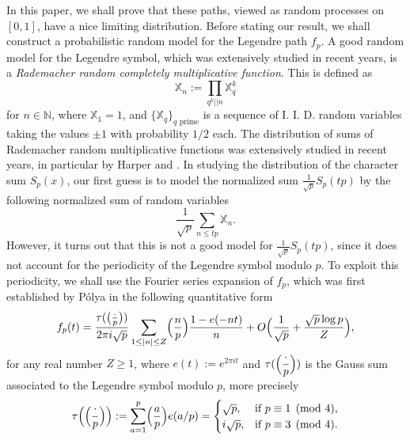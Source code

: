 \documentclass[10pt]{amsart}
\theoremstyle{plain}
\theoremstyle{definition}
\newcommand{\Legendre}[2]{\Bigl(\dfrac{#1}{#2}\Bigr)}
\newcommand{\legendre}[2]{\bigl(\tfrac{#1}{#2}\bigr)}
\newcommand{\X}{\mathbb{X}}
\begin{document}
In this paper, we shall prove that these paths, viewed as random processes on $[0, 1]$, have a nice limiting distribution. Before stating our result, we shall construct a probabilistic random model for the Legendre path $f_p$.
A good random model for the Legendre symbol, which was extensively studied in recent years, is a \emph{Rademacher random completely multiplicative function}. This is defined as\vspace*{-3pt}
\begin{equation}\label{eq: RademacherRandom}\X_n:= \prod_{q^k|| n} \X_q^k
\end{equation}
for $n\in \mathbb{N}$, where $\X_1=1$, and $\{\X_q\}_{q \text{ prime}}$ is a sequence of I. I. D. random variables taking the values $\pm 1$ with probability $1/2$ each. The distribution of sums of Rademacher random multiplicative functions was extensively studied in recent years, in particular by Harper \cite{Ha1} and \cite{Ha2}. In studying the distribution of the character sum $S_p(x)$, our first guess is to model the normalized sum $\frac{1}{\sqrt{p}}S_p(tp)$ by the following normalized sum of random variables
\[
\frac{1}{\sqrt{p}}\sum_{n\leq tp }\X_n.\]
However, it turns out that this is not a good model for $\frac{1}{\sqrt{p}}S_p(tp)$, since it does not account for the periodicity of the Legendre symbol modulo $p$. To exploit this periodicity, we shall use the Fourier series expansion of $f_p$, which was first established by Pólya in the following quantitative form \cite[eq.\,(9.19), p.\,311]{MoVaBook}
\begin{equation}\label{eq: definition Legendre path}
f_p(t) = \frac{\tau(\legendre{\cdot}{p})}{2 \pi i \sqrt{p}} \sum_{1 \leq |n| \leq Z} \Legendre{n}{p} \frac{1 - e(-nt)}{n} + O \Bigl(\frac{1}{\sqrt{p}}+\frac{\sqrt{p}\log p}{Z} \Bigr),
\end{equation}
for any real number $Z\geq 1$, where $e(t):= e^{2\pi i t}$ and $\tau(\Legendre{\cdot}{p})$ is the Gauss sum associated to the Legendre symbol modulo $p$, more precisely
\begin{equation}\label{eq: GaussSum}
\begin{aligned}
\tau\Bigl(\Legendre{\cdot}{p}\Bigr) := \sum_{a = 1}^p \Legendre{a}{p} e(a/p) = \begin{cases}
\sqrt{p}, & \text{if } p \equiv 1 \pmod 4, \\
i \sqrt{p}, & \text{if } p \equiv 3 \pmod 4.
\end{cases}
\end{aligned}
\end{equation}
\end{document}
